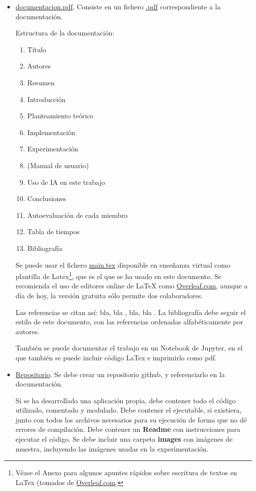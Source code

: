 \documentclass[a4paper]{article}
\begin{document}
 \begin{itemize}
\item \url{documentacion.pdf}. Consiste en un fichero \url{.pdf} correspondiente a la documentación. 

Estructura de la documentación:

\begin{enumerate}
\item[]  Título
\item[]  Autores
\item[]  Resumen
\item  Introducción 
\item  Planteamiento teórico 
\item  Implementación
\item  Experimentación
\item  (Manual de usuario)
\item Uso de IA en este trabajo
\item  Conclusiones
\item Autoevaluación de cada miembro
\item  Tabla de tiempos
\item[]  Bibliografía
\end{enumerate}

Se puede usar el fichero \url{main.tex} disponible en enseñanza virtual como plantilla de Latex\footnote{Véase el Anexo para algunos apuntes rápidos sobre escritura de textos en LaTex (tomados de \url{Overleaf.com}.}, que es el que se ha usado en este documento. Se recomienda el uso de editores online de LaTeX como \url{Overleaf.com}, aunque a día de hoy, la versión gratuita sólo permite dos colaboradores.

Las referencias se citan así:
bla, bla \cite{clave:revista}, bla, bla \cite{clave:libro}. La bibliografía
debe seguir el estilo de este documento, con las referencias ordenadas alfabéticamente por autores.

También se puede documentar el trabajo en un Notebook de Jupyter, en el que también se puede incluir código LaTex e imprimirlo como pdf.

\item \url{Repositorio}. Se debe crear un repositorio github, y referenciarlo en la documentación. 

Si se ha desarrollado una aplicación propia, debe contener todo el código utilizado, comentado y modulado. Debe contener el ejecutable, si existiera, junto con todos los archivos necesarios para su ejecución de forma que no dé errores de compilación.
Debe contener un {\bf Readme} con instrucciones para ejecutar el código.
Se debe incluir una carpeta \textbf{images} con imágenes de muestra, incluyendo las imágenes usadas en la experimentación.


\end{itemize}
\end{document}
